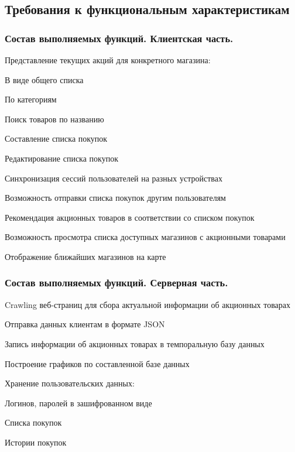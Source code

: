 \subsection{Требования к функциональным характеристикам}

\subsubsection{Состав выполняемых функций. Клиентская часть.}
\begin{my_enumerate}
\item Представление текущих акций для конкретного магазина:
    \begin{my_enumerate}
    \item В виде общего списка
    \item По категориям
    \end{my_enumerate}
\item Поиск товаров по названию
\item Составление списка покупок
\item Редактирование списка покупок
\item Синхронизация сессий пользователей на разных устройствах
\item Возможность отправки списка покупок другим пользователям
\item Рекомендация акционных товаров в соответствии со списком покупок
\item Возможность просмотра списка доступных магазинов с акционными товарами
\item Отображение ближайших магазинов на карте
\end{my_enumerate}

\subsubsection{Состав выполняемых функций. Серверная часть.}
\begin{my_enumerate}
\item Crawling веб-страниц для сбора актуальной информации об акционных товарах
\item Отправка данных клиентам в формате JSON
\item Запись информации об акционных товарах в темпоральную базу данных
\item Построение графиков по составленной базе данных
\item Хранение пользовательских данных:
    \begin{my_enumerate}
        \item Логинов, паролей в зашифрованном виде
        \item Списка покупок 
        \item Истории покупок
    \end{my_enumerate}
\end{my_enumerate}


